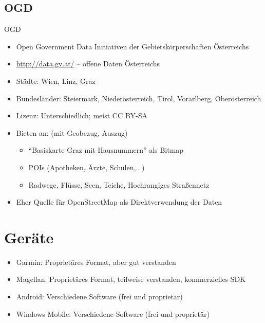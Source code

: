 \documentclass{beamer}
\begin{document}
\subsection{OGD}
\begin{frame}{OGD}
  \begin{itemize}
    \item Open Government Data Initiativen der Gebietskörperschaften
      Österreichs
    \item \url{http://data.gv.at/} -- offene Daten Österreichs
    \item Städte: Wien, Linz, Graz
    \item Bundesländer: Steiermark, Niederösterreich, Tirol,
      Vorarlberg, Oberösterreich
    \item Lizenz: Unterschiedlich; meist CC BY-SA
    \item Bieten an: (mit Geobezug, Auszug)
    \begin{itemize}
      \item ``Basiskarte Graz mit Hausnummern'' als Bitmap
      \item POIs (Apotheken, Ärzte, Schulen,...)
      \item Radwege, Flüsse, Seen, Teiche, Hochrangiges Straßennetz
    \end{itemize}
    \item Eher Quelle für OpenStreetMap als Direktverwendung der Daten
  \end{itemize}
\end{frame}

\section{Geräte}
\begin{frame}
  \begin{itemize}
    \item Garmin: Proprietäres Format, aber gut
      verstanden
    \item Magellan: Proprietäres Format, teilweise
      verstanden, kommerzielles SDK
    \item Android: Verschiedene Software (frei und proprietär)
    \item Windows Mobile: Verschiedene Software (frei und proprietär)
  \end{itemize}
\end{frame}
\end{document}
